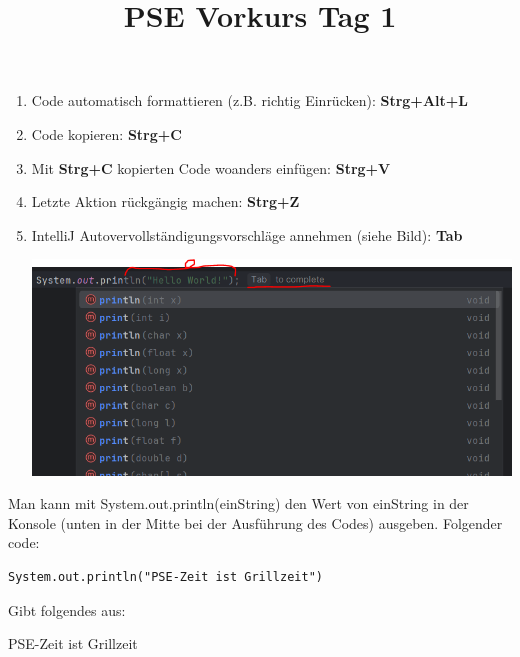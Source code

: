 \documentclass{../../sheet}
\title{PSE Vorkurs Tag 1}
\begin{document}
\begin{enumerate}
    \item Code automatisch formattieren (z.B. richtig Einrücken): \textbf{Strg+Alt+L}
    \item Code kopieren: \textbf{Strg+C}
    \item Mit \textbf{Strg+C} kopierten Code woanders einfügen: \textbf{Strg+V}
    \item Letzte Aktion rückgängig machen: \textbf{Strg+Z}
    \item IntelliJ Autovervollständigungsvorschläge annehmen (siehe Bild): \textbf{Tab}
    
    \begin{center}
        \includegraphics{img/AutocompleteIntelliJ.PNG}
    \end{center}
\end{enumerate}
\newpage


Man kann mit System.out.println(einString) den Wert von einString in der Konsole (unten in der Mitte bei der Ausführung des Codes) ausgeben. Folgender code:
\begin{verbatim}
System.out.println("PSE-Zeit ist Grillzeit")
\end{verbatim}
Gibt folgendes aus:
\begin{ausgabe}
    PSE-Zeit ist Grillzeit
\end{ausgabe}
\end{document}
